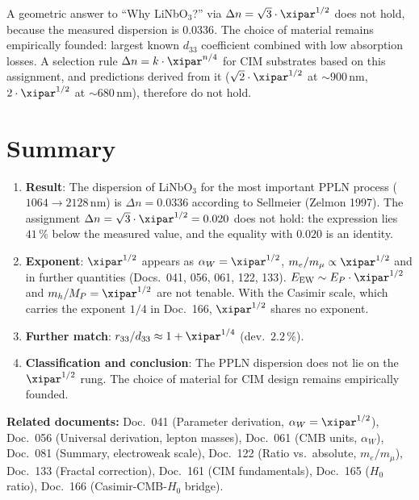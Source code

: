A geometric answer to ``Why LiNbO$_3$?'' via $\Delta n = \sqrt{3}\cdot\xipar^{1/2}$
does not hold, because the measured dispersion is $0.0336$. The choice of material
remains empirically founded: largest known $d_{33}$ coefficient combined with low
absorption losses. A selection rule $\Delta n = k\cdot\xipar^{n/4}$ for CIM substrates
based on this assignment, and predictions derived from it
($\sqrt{2}\cdot\xipar^{1/2}$ at $\sim 900\,\text{nm}$, $2\cdot\xipar^{1/2}$ at
$\sim 680\,\text{nm}$), therefore do not hold.

\clearpage

\section{Summary}
\label{sec:summary}

\begin{enumerate}

    \item \textbf{Result}: The dispersion of LiNbO$_3$ for the most important
    PPLN process ($1064 \to 2128\,\text{nm}$) is $\Delta n = 0.0336$ according
    to Sellmeier (Zelmon 1997). The assignment
    $\Delta n = \sqrt{3}\cdot\xipar^{1/2} = 0.020$ does not hold: the expression
    lies $41\,\%$ below the measured value, and the equality with $0.020$ is an
    identity.

    \item \textbf{Exponent}: $\xipar^{1/2}$ appears as
    $\alpha_W = \xipar^{1/2}$, $m_e/m_\mu \propto \xipar^{1/2}$ and in further
    quantities (Docs.~041, 056, 061, 122, 133). $E_\mathrm{EW} \sim E_P\cdot\xipar^{1/2}$
    and $m_h/M_P = \xipar^{1/2}$ are not tenable. With the Casimir scale, which
    carries the exponent $1/4$ in Doc.~166, $\xipar^{1/2}$ shares no exponent.

    \item \textbf{Further match}: $r_{33}/d_{33} \approx 1 + \xipar^{1/4}$
    (dev.\ $2.2\,\%$).

    \item \textbf{Classification and conclusion}: The PPLN dispersion does not
    lie on the $\xipar^{1/2}$ rung. The choice of material for CIM design remains
    empirically founded.

\end{enumerate}

\bigskip\bigskip

\noindent\textbf{Related documents:}
Doc.~041 (Parameter derivation, $\alpha_W = \xipar^{1/2}$),
Doc.~056 (Universal derivation, lepton masses),
Doc.~061 (CMB units, $\alpha_W$),
Doc.~081 (Summary, electroweak scale),
Doc.~122 (Ratio vs.\ absolute, $m_e/m_\mu$),
Doc.~133 (Fractal correction),
Doc.~161 (CIM fundamentals),
Doc.~165 ($H_0$ ratio),
Doc.~166 (Casimir-CMB-$H_0$ bridge).
